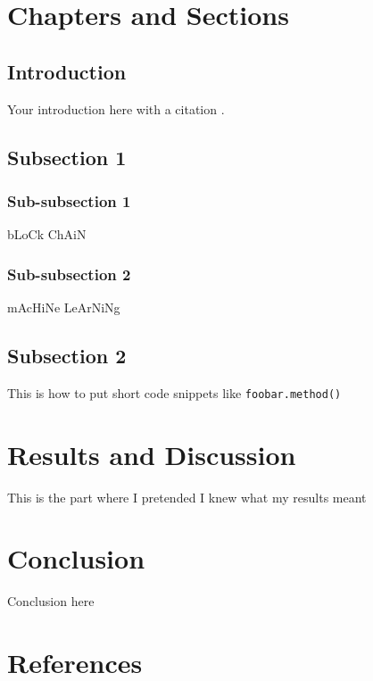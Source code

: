 \documentclass[12pt]{article}
\begin{document}
\begin{spacing}{1.9}
\section{Chapters and Sections}
\subsection{Introduction}
Your introduction here with a citation \cite{Atsalakis}. 

\subsection{Subsection 1}
    \subsubsection{Sub-subsection 1}
    bLoCk ChAiN
    
    \subsubsection{Sub-subsection 2}
    mAcHiNe LeArNiNg
    
    

\subsection{Subsection 2}
This is how to put short code snippets like \texttt{foobar.method()}

\section{Results and Discussion}
This is the part where I pretended I knew what my results meant

\section{Conclusion}
Conclusion here

\section{References}
\printbibliography


\end{spacing}
\end{document}
